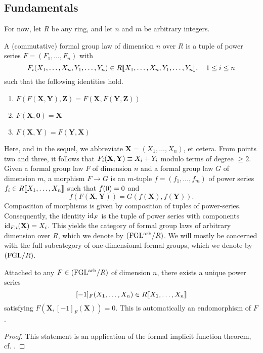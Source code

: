 \documentclass[../main.tex]{subfiles}
\begin{document}
\subsection{Fundamentals} %
\label{sub:Basic Notions}
For now, let $R$ be any ring, and let $n$ and $m$ be arbitrary integers.
\begin{defi}
  A (commutative) formal group law  of dimension
  $n$ over $R$ is a tuple of
  power series $F = (F_1, \dots, F_n)$ with $$F_i(X_1, \dots, X_n,Y_1,
  \dots, Y_n) \in R\llbracket X_1, \dots,
  X_n, Y_1, \dots, Y_n\rrbracket, \quad 1 \leq i \leq n$$
  such that the following identities hold.
  \begin{enumerate}
    \item $F(F (\mathbf X, \mathbf Y), \mathbf Z) = 
      F(\mathbf X, F(\mathbf Y, \mathbf Z))$
    \item $F( \mathbf X, \mathbf 0) = \mathbf X$
    \item $F( \mathbf X, \mathbf Y) = F(\mathbf Y, \mathbf X)$
  \end{enumerate}
  Here, and in the sequel, we abbreviate $\mathbf X =
  (X_1, \dots, X_n)$, et cetera. From points two and three, it follows that 
  $F_i(\mathbf{X}, \mathbf{Y}) \equiv X_i + Y_i$ modulo terms of degree $\geq 2$.
  Given a formal group law $F$ of dimension $n$ and a formal group law
  $G$ of dimension $m$,
  a morphism $F \to G$ is an $m$-tuple $f = (f_1, \dots, f_m)$ 
  of power series $f_i \in R\llbracket X_1, \dots, X_n \rrbracket$ such that ${f}(0)=0$ and
  \begin{equation*}
    f(F( \mathbf X, \mathbf Y)) = G(f( \mathbf X), f( \mathbf Y) ).
  \end{equation*}
  Composition of morphisms is given by composition of tuples of power-series. 
  Consequently, the identity $\operatorname{id}_{F}$ is the tuple of power series with
  components $\operatorname{id}_{F,i}( \mathbf X) = X_i$. 
  This yields the category of formal group laws of arbitrary dimension over $R$,
  which we denote by ${(\mathrm{FGL^{arb}}/{R})}$. We will mostly be concerned with the full
  subcategory of one-dimensional formal groups, which we denote by ${(\mathrm{FGL}/{R})}$. 
\end{defi}

\begin{lem}\label{lem:FGLAdditive}
    Attached to any $F \in {(\mathrm{FGL^{arb}}/{R})}$ of dimension $n$, there exists
      a unique power series 
      $$[-1]_F(X_1, \dots, X_n) \in R\llbracket X_1, \dots, X_n\rrbracket$$
      satisfying $F(\mathbf X, [-1]_F(\mathbf X)) = 0$. This is automatically
      an endomorphism of $F$. 
\end{lem}
\begin{proof}
    This statement is an application of the formal implicit function theorem,
    cf. \cite[Theorem A.4.7]{hazewinkel1978formal}.   
\end{proof}
\end{document}

